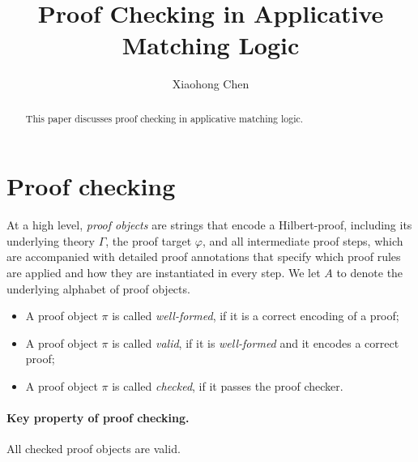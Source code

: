 \documentclass{article}
\title{Proof Checking in Applicative Matching Logic}
\author{Xiaohong Chen}
\date{}
\begin{document}
\maketitle
\begin{abstract}
This paper discusses proof checking in applicative matching logic.
\end{abstract}



\section{Proof checking}

At a high level, \emph{proof objects} are strings that encode
a Hilbert-proof, including its underlying theory $\Gamma$,
the proof target $\varphi$, and all intermediate proof steps,
which are accompanied with detailed proof annotations that
specify which proof rules are applied and how they are instantiated
in every step.
We let $A$ to denote the underlying alphabet of proof objects.

\begin{itemize}
\item A proof object $\pi$ is called \emph{well-formed}, if it is a correct 
encoding of a proof;
\item A proof object $\pi$ is called \emph{valid}, if it is \emph{well-formed}
and it encodes a correct proof;
\item A proof object $\pi$ is called \emph{checked}, if it passes the proof 
checker.
\end{itemize}

\paragraph{Key property of proof checking.}
All checked proof objects are valid.


\end{document}
